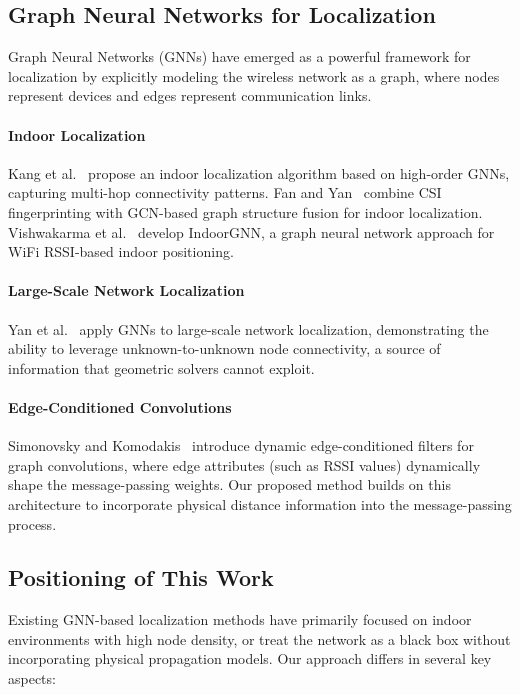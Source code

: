 \documentclass[master,final,11pt]{iscs-thesis}
\begin{document}
\subsection{Graph Neural Networks for Localization}

Graph Neural Networks (GNNs) have emerged as a powerful framework for localization by explicitly modeling the wireless network as a graph, where nodes represent devices and edges represent communication links.

\paragraph{Indoor Localization}
Kang et al.~\cite{kang2023indoor} propose an indoor localization algorithm based on high-order GNNs, capturing multi-hop connectivity patterns.
Fan and Yan~\cite{fan2023csi} combine CSI fingerprinting with GCN-based graph structure fusion for indoor localization.
Vishwakarma et al.~\cite{vishwakarma2023indoorgnn} develop IndoorGNN, a graph neural network approach for WiFi RSSI-based indoor positioning.

\paragraph{Large-Scale Network Localization}
Yan et al.~\cite{yan2021gnn} apply GNNs to large-scale network localization, demonstrating the ability to leverage unknown-to-unknown node connectivity, a source of information that geometric solvers cannot exploit.

\paragraph{Edge-Conditioned Convolutions}
Simonovsky and Komodakis~\cite{simonovsky2017nnconv} introduce dynamic edge-conditioned filters for graph convolutions, where edge attributes (such as RSSI values) dynamically shape the message-passing weights.
Our proposed method builds on this architecture to incorporate physical distance information into the message-passing process.

\subsection{Positioning of This Work}

Existing GNN-based localization methods have primarily focused on indoor environments with high node density, or treat the network as a black box without incorporating physical propagation models.
Our approach differs in several key aspects:
\end{document}
